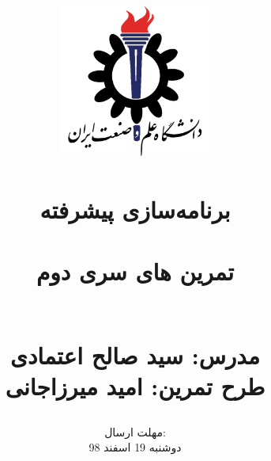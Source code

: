 \title{
    \center
    \includegraphics[width=5cm, height=5cm]{images/IUST_logo_color.png} \\
    \textsc{} \\
    [25pt] 
    
برنامه‌سازی پیشرفته\\
\\تمرین های سری دوم

 \textsc{\rl{}} \\

مدرس: سید صالح اعتمادی \\

طرح تمرین: امید میرزاجانی
}
\author{
\selectfont
}
\date{
    مهلت ارسال:\\
دوشنبه 19 اسفند 98
}
